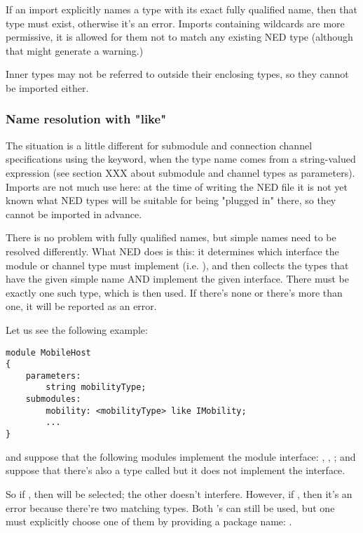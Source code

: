If an import explicitly names a type with its exact fully qualified name,
then that type must exist, otherwise it's an error. Imports containing
wildcards are more permissive, it is allowed for them not to match any
existing NED type (although that might generate a warning.)

Inner types may not be referred to outside their enclosing types, so they
cannot be imported either.


\subsubsection{Name resolution with "like"}

The situation is a little different for submodule and connection channel
specifications using the  keyword, when the type name comes
from a string-valued expression (see section XXX about submodule and
channel types as parameters). Imports are not much use here: at the time of
writing the NED file it is not yet known what NED types will be suitable
for being "plugged in" there, so they cannot be imported in advance.

There is no problem with fully qualified names, but simple names need
to be resolved differently. What NED does is this: it determines which
interface the module or channel type must implement (i.e. ),
and then collects the types that have the given simple name AND implement
the given interface. There must be exactly one such type, which is then used.
If there's none or there's more than one, it will be reported as an error.

Let us see the following example:

\begin{Verbatim}
module MobileHost
{
    parameters:
        string mobilityType;
    submodules:
        mobility: <mobilityType> like IMobility;
        ...
}
\end{Verbatim}

and suppose that the following modules implement the  module
interface: , ,
; and suppose that there's also a type
called  but it does not implement the
interface.

So if , then
 will be selected; the other
 doesn't interfere. However, if
, then it's an error because there're two
matching  types. Both 's can still be used,
but one must explicitly choose one of them by providing a package name:
.


